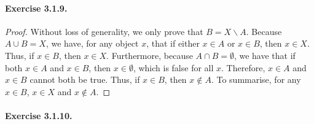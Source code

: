 \paragraph{Exercise 3.1.9.}
\begin{proof}
    Without loss of generality, we only prove that $B = X \backslash A$. Because $A \cup B = X$, we have, for any object $x$, that if either $x\in A$ or $x\in B$, then $x\in X$. Thus, if $x\in B$, then $x\in X$. Furthermore, because $A \cap B = \emptyset$, we have that if both $x\in A$ and $x\in B$, then $x\in \emptyset$, which is false for all $x$. Therefore, $x\in A$ and $x\in B$ cannot both be true. Thus, if $x\in B$, then $x\notin A$. To summarise, for any $x\in B$, $x\in X$ and $x\notin A$.
\end{proof}

\paragraph{Exercise 3.1.10.}

